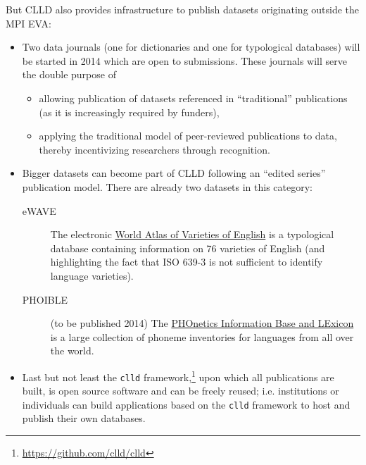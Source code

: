 \documentclass[a4paper,10pt]{article}
\begin{document}
But CLLD also provides infrastructure to publish datasets originating outside the MPI EVA:
\begin{itemize}
\item Two data journals (one for dictionaries and one for typological databases) will be started
in 2014 which are open to submissions. These journals will serve the double purpose of
\begin{itemize}
\item allowing publication of datasets referenced in ``traditional'' publications (as it is
increasingly required by funders),
\item applying the traditional model of peer-reviewed publications to data, thereby incentivizing
researchers through recognition.
\end{itemize}
\item Bigger datasets can become part of CLLD following an ``edited series'' publication model.
There are already two datasets in this category:
\begin{description}
\item[eWAVE] The electronic \href{http://ewave-atlas.org/}{World Atlas of Varieties of English} is a typological database containing information on 76 varieties of English (and highlighting the fact that ISO 639-3 is not sufficient to identify language varieties).
\item[PHOIBLE] (to be published 2014) The \href{http://phoible.org}{PHOnetics Information Base and LExicon} is a large collection of phoneme inventories for languages from all over the world.
\end{description}
\item Last but not least the \texttt{clld} framework,\footnote{\url{https://github.com/clld/clld}}
upon which all publications are built, is open source software and can be freely reused; i.e.
institutions or individuals can build applications based on the \texttt{clld} framework to
host and publish their own databases.
\end{itemize}
\end{document}
